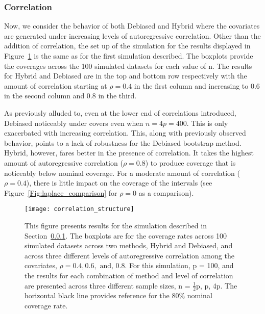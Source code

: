 \subsubsection{Correlation}\label{Sec:Correlation}

Now, we consider the behavior of both Debiased and Hybrid where the covariates are generated under increasing levels of autoregressive correlation. Other than the addition of correlation, the set up of the simulation for the results displayed in Figure~\ref{Fig:correlation_structure} is the same as for the first simulation described. The boxplots provide the coverages across the 100 simulated datasets for each value of n. The results for Hybrid and Debiased are in the top and bottom row respectively with the amount of correlation starting at $\rho = 0.4$ in the first column and increasing to $0.6$ in the second column and $0.8$ in the third. 

As previously alluded to, even at the lower end of correlations introduced, Debiased noticeably under covers even when $n = 4p = 400$. This is only exacerbated with increasing correlation. This, along with previously observed behavior, points to a lack of robustness for the Debiased bootstrap method. Hybrid, however, fares better in the presence of correlation. It takes the highest amount of autoregressive correlation ($\rho = 0.8$) to produce coverage that is noticeably below nominal coverage. For a moderate amount of correlation ($\rho = 0.4$), there is little impact on the coverage of the intervals (see Figure~\ref{Fig:laplace_comparison} for $\rho = 0$ as a comparison). 

\begin{figure}[hbtp]
  \begin{center}
  \texttt{[image: correlation\_structure]}
  \caption{\label{Fig:correlation_structure} This figure presents results for the simulation described in Section~\ref{Sec:Correlation}. The boxplots are for the coverage rates across 100 simulated datasets across two methods, Hybrid and Debiased, and across three different levels of autoregressive correlation among the covariates, $\rho = 0.4, 0.6, \text{ and, } 0.8$. For this simulation, p = 100, and the results for each combination of method and level of correlation are presented across three different sample sizes, n = $\frac{1}{2}$p, p, 4p. The horizontal black line provides reference for the 80\% nominal coverage rate.}
  \end{center}
\end{figure}

